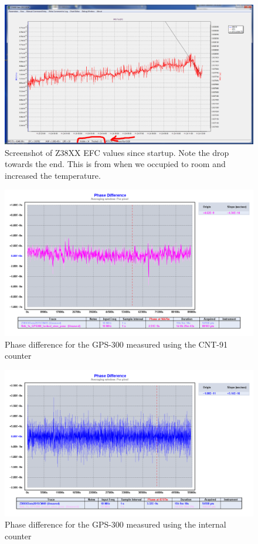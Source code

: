 \documentclass[11pt,english,a4paper]{article}
\begin{document}
\begin{figure}[!htb]
  \centering
    \includegraphics[width=1\textwidth]{z38xx_EFC_oppvarmet_zoom.PNG}
      \caption{Screenshot of Z38XX EFC values since startup. Note the drop towards the end. This is from when we occupied to room and increased the temperature.}
      \label{fig:Z38XX_gpsdo12}
\end{figure}

\begin{figure}[!htb]
  \centering
    \includegraphics[width=1\textwidth]{part1_spm3_fbtb_phase_diff.png}
      \caption{Phase difference for the GPS-300 measured using the CNT-91 counter}
          \label{fig:part1_spm3_fbtb_phase_diff}
\end{figure}

\begin{figure}[!htb]
  \centering
    \includegraphics[width=1\textwidth]{part1_spm3_x38_phase_diff.png}
      \caption{Phase difference for the GPS-300 measured using the internal counter}
          \label{fig:part1_spm3_x38_phase_diff}
\end{figure}
\end{document}
